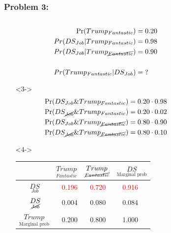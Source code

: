 \documentclass[xcolor={dvipsnames}]{beamer}
\begin{document}
\frame
{
 \frametitle{Problem 3:}

\begin{columns}
\begin{column}{.55\textwidth}

\vspace{-1.5em}

\begin{itemize}
\item[]
\footnotesize
\begin{align*}
\Pr(Trump_{Fantastic}) = {} & 0.20\\
Pr(DS_{Job} | Trump_{Fantastic}) = {} & 0.98\\
Pr(DS_{Job} | Trump_{\cancel{Fantastic}}) = {} & 0.90\\{}\\
Pr(Trump_{Fantastic} | DS_{Job} ) = {} & ?
\end{align*}

\item[]<3->
\vspace{-1em}
\footnotesize
\begin{align*}
\Pr(DS_{Job} \& Trump_{Fantastic}) = {} & 0.20 \cdot 0.98\\
\Pr(DS_{\cancel{Job}} \& Trump_{Fantastic}) = {} & 0.20 \cdot 0.02\\
\Pr(DS_{{Job}} \& Trump_{\cancel{Fantastic}}) = {} & 0.80 \cdot 0.90\\
\Pr(DS_{\cancel{Job}} \& Trump_{\cancel{Fantastic}}) = {} & 0.80 \cdot 0.10\\
\end{align*}

\item[]<4->
\vspace{-1em}
\begin{tabular}{m{1.1cm}|m{1.5cm}m{1.5cm}|m{1.5cm}}  %
                           & $\underset{Fantastic}{Trump}$ & $\underset{\cancel{Fantastic}}{Trump}$ & $\underset{\text{Marginal prob}}{DS}$\\ \hline
$\quad\;\;\underset{Job}{DS}$ &  $\;\;\;$\textcolor{red}{0.196} & $\;\;\;$\textcolor{red}{0.720} & $\;\;\;$\textcolor{red}{0.916} \\
$\quad\;\;\underset{\cancel{Job}}{DS}$ & $\;\;\;$0.004 & $\;\;\;$0.080 & $\;\;\;$0.084 \\\hline
 $\underset{\text{Marginal prob}}{Trump}$& $\;\;\;$0.200 & $\;\;\;$0.800 & $\;\;\;$1.000
\end{tabular}

\end{itemize}
\end{column}
\begin{column}{.45\textwidth}


\end{column}
\end{columns}}
\end{document}
